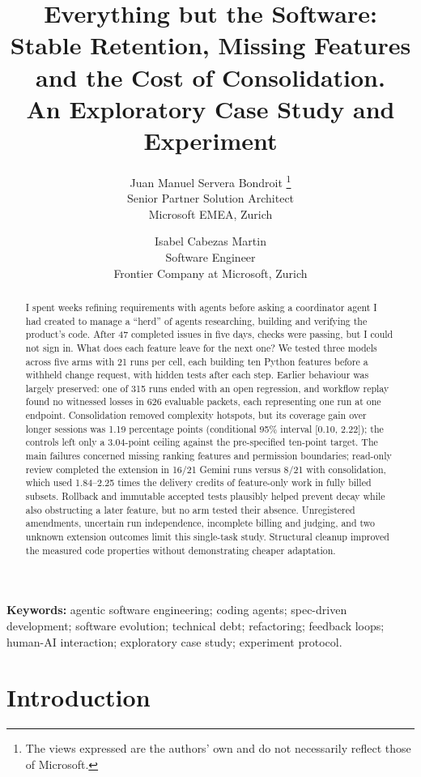 \documentclass[11pt,a4paper]{article}
\title{Everything but the Software:\\[4pt]
\large Stable Retention, Missing Features and the Cost of Consolidation.\\
An Exploratory Case Study and Experiment}
\author{%
Juan Manuel Servera Bondroit%
\thanks{The views expressed are the authors' own and do not
necessarily reflect those of Microsoft.}\\[4pt]
\small Senior Partner Solution Architect\\
\small Microsoft EMEA, Zurich
\and
Isabel Cabezas Martin\\[4pt]
\small Software Engineer\\
\small Frontier Company at Microsoft, Zurich
}
\begin{document}
\maketitle

\begin{abstract}
I spent weeks refining requirements with agents before asking a coordinator
agent I had created to manage a ``herd'' of agents researching, building and
verifying the product's code. After 47 completed issues in five days, checks
were passing, but I could not sign in.
What does each feature leave for the next one?
We tested three models across five arms with 21 runs per cell, each building
ten Python features before a withheld change request, with hidden tests
after each step.
Earlier behaviour was largely preserved: one of 315 runs ended with an
open regression, and workflow replay found no witnessed losses in 626
evaluable packets, each representing one run at one endpoint.
Consolidation removed complexity hotspots, but its coverage gain over longer
sessions was 1.19 percentage points (conditional 95\% interval [0.10, 2.22]);
the controls left only a 3.04-point ceiling against the pre-specified
ten-point target.
The main failures concerned missing ranking features and permission
boundaries; read-only review completed the extension in 16/21 Gemini runs
versus 8/21 with consolidation, which used 1.84--2.25 times the delivery
credits of feature-only work in fully billed subsets.
Rollback and immutable accepted tests plausibly helped prevent decay while
also obstructing a later feature, but no arm tested their absence.
Unregistered amendments, uncertain run independence, incomplete billing and
judging, and two unknown extension outcomes limit this single-task study.
Structural cleanup improved the measured code properties without
demonstrating cheaper adaptation.
\end{abstract}

\noindent\textbf{Keywords:} agentic software engineering; coding agents;
spec-driven development; software evolution; technical debt; refactoring;
feedback loops; human-AI interaction; exploratory case study; experiment protocol.

\section{Introduction}\label{sec:intro}
\end{document}
